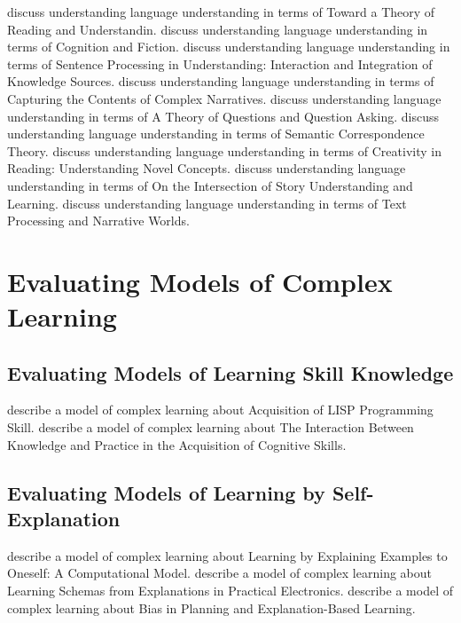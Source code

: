 \cite{rammoorman1999toru} discuss understanding language understanding in terms of Toward a Theory of Reading and Understandin.
\cite{rapaport1999caf} discuss understanding language understanding in terms of Cognition and Fiction.
\cite{mahesh1999spiu} discuss understanding language understanding in terms of Sentence Processing in Understanding: Interaction and Integration of Knowledge Sources.
\cite{domeshek1999ctccn} discuss understanding language understanding in terms of Capturing the Contents of Complex Narratives.
\cite{ram1999toqqa} discuss understanding language understanding in terms of A Theory of Questions and Question Asking.
\cite{peterson1999sct} discuss understanding language understanding in terms of Semantic Correspondence Theory.
\cite{moorman1999crunc} discuss understanding language understanding in terms of Creativity in Reading: Understanding Novel Concepts.
\cite{coxram1999sual} discuss understanding language understanding in terms of On the Intersection of Story Understanding and Learning.
\cite{gerrig1999tpanw} discuss understanding language understanding in terms of Text Processing and Narrative Worlds.

\section{Evaluating Models of Complex Learning}


\subsection{Evaluating Models of Learning Skill Knowledge}
\cite{anderson1993alps} describe a model of complex learning about Acquisition of LISP Programming Skill.
\cite{ohlsson1993ibkpacs} describe a model of complex learning about The Interaction Between Knowledge and Practice in the Acquisition of Cognitive Skills.

\subsection{Evaluating Models of Learning by Self-Explanation}
\cite{vanlehn1993lbeeo} describe a model of complex learning about Learning by Explaining Examples to Oneself: A Computational Model.
\cite{kieras1993lsepe} describe a model of complex learning about Learning Schemas from Explanations in Practical Electronics.
\cite{rosenbloom1993bpebl} describe a model of complex learning about Bias in Planning and Explanation-Based Learning.

